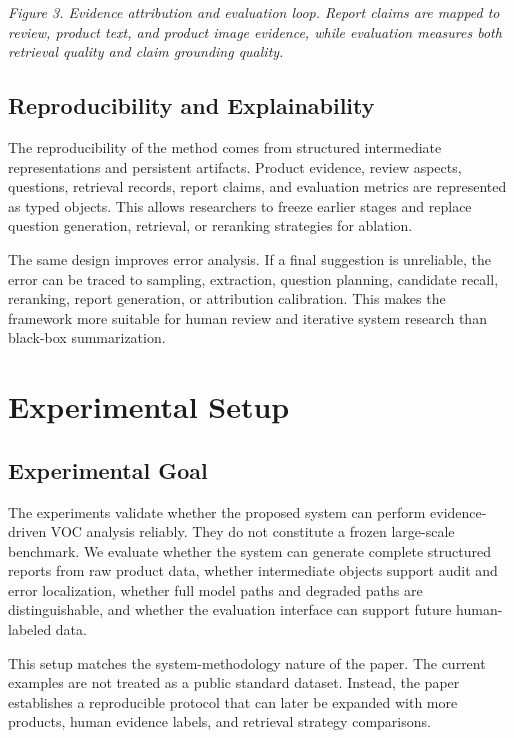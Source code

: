 \documentclass[11pt]{article}
\begin{document}
\emph{Figure 3. Evidence attribution and evaluation loop. Report claims are mapped to review, product text, and product image evidence, while evaluation measures both retrieval quality and claim grounding quality.}

\subsection{Reproducibility and Explainability}

The reproducibility of the method comes from structured intermediate representations and persistent artifacts. Product evidence, review aspects, questions, retrieval records, report claims, and evaluation metrics are represented as typed objects. This allows researchers to freeze earlier stages and replace question generation, retrieval, or reranking strategies for ablation.

The same design improves error analysis. If a final suggestion is unreliable, the error can be traced to sampling, extraction, question planning, candidate recall, reranking, report generation, or attribution calibration. This makes the framework more suitable for human review and iterative system research than black-box summarization.

\section{Experimental Setup}
\subsection{Experimental Goal}

The experiments validate whether the proposed system can perform evidence-driven VOC analysis reliably. They do not constitute a frozen large-scale benchmark. We evaluate whether the system can generate complete structured reports from raw product data, whether intermediate objects support audit and error localization, whether full model paths and degraded paths are distinguishable, and whether the evaluation interface can support future human-labeled data.

This setup matches the system-methodology nature of the paper. The current examples are not treated as a public standard dataset. Instead, the paper establishes a reproducible protocol that can later be expanded with more products, human evidence labels, and retrieval strategy comparisons.
\end{document}
